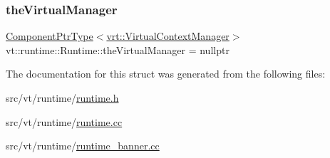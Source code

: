 \mbox{\label{structvt_1_1runtime_1_1_runtime_a85a0606ac06cd173561952676f09c077}} 
\subsubsection{\texorpdfstring{the\+Virtual\+Manager}{theVirtualManager}}
{\footnotesize\ttfamily \hyperlink{structvt_1_1runtime_1_1_runtime_a0893bf0a8c03b898e8ab66b52cec80ad}{Component\+Ptr\+Type}$<$\hyperlink{structvt_1_1vrt_1_1_virtual_context_manager}{vrt\+::\+Virtual\+Context\+Manager}$>$ vt\+::runtime\+::\+Runtime\+::the\+Virtual\+Manager = nullptr}



The documentation for this struct was generated from the following files\+:\begin{DoxyCompactItemize}
\item 
src/vt/runtime/\hyperlink{runtime_8h}{runtime.\+h}\item 
src/vt/runtime/\hyperlink{runtime_8cc}{runtime.\+cc}\item 
src/vt/runtime/\hyperlink{runtime__banner_8cc}{runtime\+\_\+banner.\+cc}\end{DoxyCompactItemize}
